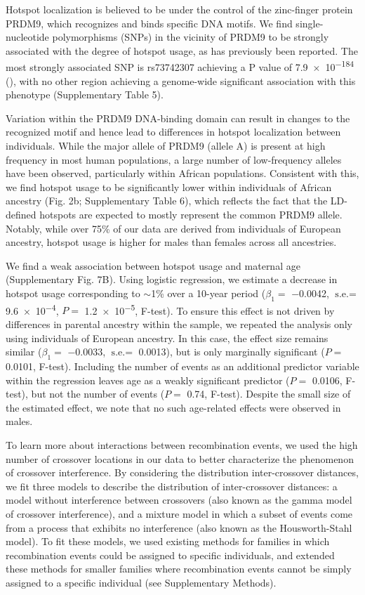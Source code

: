 Hotspot localization is believed to be under the control of the
zinc-finger protein PRDM9, which recognizes and binds specific
DNA motifs\cite{Berg2010,Berg2011,Hinch2011,Parvanov2010}. We find single-nucleotide polymorphisms
(SNPs) in the vicinity of PRDM9 to be strongly associated with
the degree of hotspot usage, as has previously been reported\cite{Kong2014,Hinch2011}.
The most strongly associated SNP is rs73742307 achieving a
P value of \num{7.9e-184} (\citet{Reynolds2013}), with no other region achieving a
genome-wide significant association with this phenotype
(Supplementary Table 5).

Variation within the PRDM9 DNA-binding domain can result
in changes to the recognized motif and hence lead to differences
in hotspot localization between individuals. While the major allele
of PRDM9 (allele A) is present at high frequency in most human
populations, a large number of low-frequency alleles have been
observed, particularly within African populations\cite{Berg2011,Parvanov2010}. Consistent
with this, we find hotspot usage to be significantly lower within
individuals of African ancestry (Fig. 2b; Supplementary Table 6),
which reflects the fact that the LD-defined hotspots are expected
to mostly represent the common PRDM9 allele. Notably, while
over 75\% of our data are derived from individuals of European
ancestry, hotspot usage is higher for males than females across all
ancestries.

We find a weak association between hotspot usage and
maternal age (Supplementary Fig. 7B). Using logistic regression,
we estimate a decrease in hotspot usage corresponding to
$\sim$1\% over a 10-year period ($\beta_1=$ \num{-0.0042}, $\text{s.e.}=$ \num{9.6e-4}, 
$P=$ \num{1.2e-5}, F-test). To ensure this effect is not driven by
differences in parental ancestry within the sample, we repeated
the analysis only using individuals of European ancestry. In this
case, the effect size remains similar ($\beta_1=$ \num{-0.0033}, $\text{s.e.}=$ 0.0013),
but is only marginally significant ($P=$ 0.0101, F-test). Including
the number of events as an additional predictor variable within
the regression leaves age as a weakly significant predictor
($P=$ 0.0106, F-test), but not the number of events ($P=$ 0.74,
F-test). Despite the small size of the estimated effect, we note that
no such age-related effects were observed in males.

To learn more about interactions between recombination
events, we used the high number of crossover locations in our
data to better characterize the phenomenon of crossover
interference. By considering the distribution inter-crossover
distances, we fit three models to describe the distribution of
inter-crossover distances: a model without interference between
crossovers (also known as the gamma model of crossover
interference\cite{Broman2000}), and a mixture model in which a subset of
events come from a process that exhibits no interference (also
known as the Housworth-Stahl model\cite{Housworth2003}). To fit these models, we
used existing methods for families in which recombination events
could be assigned to specific individuals, and extended these
methods for smaller families where recombination events cannot
be simply assigned to a specific individual (see Supplementary
Methods).

